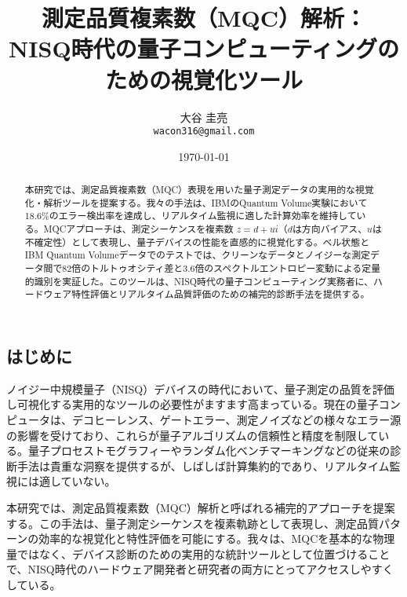 \documentclass[a4paper,11pt]{article}
\begin{document}
\begin{CJK}{UTF8}{min}

\title{測定品質複素数（MQC）解析：\\NISQ時代の量子コンピューティングのための視覚化ツール}

\author{大谷 圭亮\\
\texttt{wacon316@gmail.com}}

\date{\today}

\maketitle

\begin{abstract}
本研究では、測定品質複素数（MQC）表現を用いた量子測定データの実用的な視覚化・解析ツールを提案する。我々の手法は、IBMのQuantum Volume実験において18.6\%のエラー検出率を達成し、リアルタイム監視に適した計算効率を維持している。MQCアプローチは、測定シーケンスを複素数 $z = d + ui$（$d$は方向バイアス、$u$は不確定性）として表現し、量子デバイスの性能を直感的に視覚化する。ベル状態とIBM Quantum Volumeデータでのテストでは、クリーンなデータとノイジーな測定データ間で82倍のトルトゥオシティ差と3.6倍のスペクトルエントロピー変動による定量的識別を実証した。このツールは、NISQ時代の量子コンピューティング実務者に、ハードウェア特性評価とリアルタイム品質評価のための補完的診断手法を提供する。
\end{abstract}

\section{はじめに}

ノイジー中規模量子（NISQ）デバイスの時代において、量子測定の品質を評価し可視化する実用的なツールの必要性がますます高まっている。現在の量子コンピュータは、デコヒーレンス、ゲートエラー、測定ノイズなどの様々なエラー源の影響を受けており、これらが量子アルゴリズムの信頼性と精度を制限している。量子プロセストモグラフィーやランダム化ベンチマーキングなどの従来の診断手法は貴重な洞察を提供するが、しばしば計算集約的であり、リアルタイム監視には適していない。

本研究では、測定品質複素数（MQC）解析と呼ばれる補完的アプローチを提案する。この手法は、量子測定シーケンスを複素軌跡として表現し、測定品質パターンの効率的な視覚化と特性評価を可能にする。我々は、MQCを基本的な物理量ではなく、デバイス診断のための実用的な統計ツールとして位置づけることで、NISQ時代のハードウェア開発者と研究者の両方にとってアクセスしやすくしている。


\end{CJK}
\end{document}
